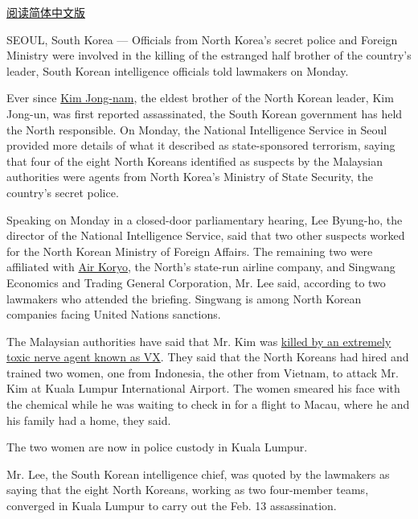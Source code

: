 \href{http://cn.nytimes.com/asia-pacific/20170228/north-korea-kim-jong-nam-state-security/}{阅读简体中文版}

SEOUL, South Korea --- Officials from North Korea's secret police and
Foreign Ministry were involved in the killing of the estranged half
brother of the country's leader, South Korean intelligence officials
told lawmakers on Monday.

Ever since
\href{https://www.nytimes.com/2017/02/14/world/asia/kim-jong-un-brother-killed-malaysia.html?action=click\&contentCollection=Asia\%20Pacific\&module=RelatedCoverage\&region=Marginalia\&pgtype=article}{Kim
Jong-nam}, the eldest brother of the North Korean leader, Kim Jong-un,
was first reported assassinated, the South Korean government has held
the North responsible. On Monday, the National Intelligence Service in
Seoul provided more details of what it described as state-sponsored
terrorism, saying that four of the eight North Koreans identified as
suspects by the Malaysian authorities were agents from North Korea's
Ministry of State Security, the country's secret police.

Speaking on Monday in a closed-door parliamentary hearing, Lee Byung-ho,
the director of the National Intelligence Service, said that two other
suspects worked for the North Korean Ministry of Foreign Affairs. The
remaining two were affiliated with
\href{http://www.airkoryo.com.kp/}{Air Koryo}, the North's state-run
airline company, and Singwang Economics and Trading General Corporation,
Mr. Lee said, according to two lawmakers who attended the briefing.
Singwang is among North Korean companies facing United Nations
sanctions.

The Malaysian authorities have said that Mr. Kim was
\href{https://www.nytimes.com/2017/02/23/world/asia/kim-jong-nam-vx-nerve-agent-.html?action=click\&contentCollection=Asia\%20Pacific\&module=RelatedCoverage\&region=Marginalia\&pgtype=article}{killed
by an extremely toxic nerve agent known as VX}. They said that the North
Koreans had hired and trained two women, one from Indonesia, the other
from Vietnam, to attack Mr. Kim at Kuala Lumpur International Airport.
The women smeared his face with the chemical while he was waiting to
check in for a flight to Macau, where he and his family had a home, they
said.

The two women are now in police custody in Kuala Lumpur.

Mr. Lee, the South Korean intelligence chief, was quoted by the
lawmakers as saying that the eight North Koreans, working as two
four-member teams, converged in Kuala Lumpur to carry out the Feb. 13
assassination.

